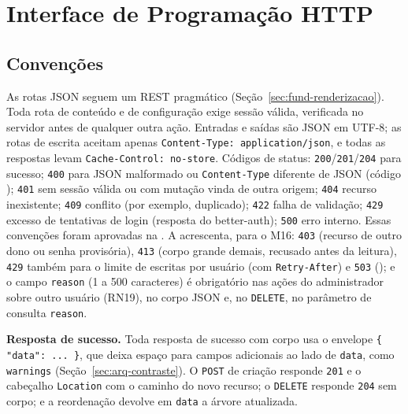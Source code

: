 
\section{Interface de Programação HTTP}\label{sec:arq-api}

\subsection{Convenções}

As rotas JSON seguem um REST pragmático (Seção~\ref{sec:fund-renderizacao}). Toda rota de conteúdo e de configuração exige sessão válida, verificada no servidor antes de qualquer outra ação. Entradas e saídas são JSON em UTF-8; as rotas de escrita aceitam apenas \texttt{Content-Type: application/json}, e todas as respostas levam \texttt{Cache-Control: no-store}. Códigos de status: \texttt{200}/\texttt{201}/\texttt{204} para sucesso; \texttt{400} para JSON malformado ou \texttt{Content-Type} diferente de JSON (código ); \texttt{401} sem sessão válida ou com mutação vinda de outra origem; \texttt{404} recurso inexistente; \texttt{409} conflito (por exemplo,  duplicado); \texttt{422} falha de validação; \texttt{429} excesso de tentativas de login (resposta do better-auth); \texttt{500} erro interno. Essas convenções foram aprovadas na . A  acrescenta, para o M16: \texttt{403} (recurso de outro dono ou senha provisória), \texttt{413} (corpo grande demais, recusado antes da leitura), \texttt{429} também para o limite de escritas por usuário (com \texttt{Retry-After}) e \texttt{503} (); e o campo \texttt{reason} (1 a 500 caracteres) é obrigatório nas ações do administrador sobre outro usuário (RN19), no corpo JSON e, no \texttt{DELETE}, no parâmetro de consulta \texttt{reason}.

\textbf{Resposta de sucesso.} Toda resposta de sucesso com corpo usa o envelope \texttt{\{ "data": ... \}}, que deixa espaço para campos adicionais ao lado de \texttt{data}, como \texttt{warnings} (Seção~\ref{sec:arq-contraste}). O \texttt{POST} de criação responde \texttt{201} e o cabeçalho \texttt{Location} com o caminho do novo recurso; o \texttt{DELETE} responde \texttt{204} sem corpo; e a reordenação devolve em \texttt{data} a árvore atualizada.

